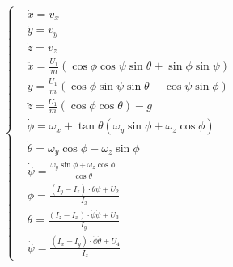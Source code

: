 \documentclass[lang=chs, degree=master, blindreview=true, winfonts=true]{yanputhesis}
\begin{document}
\begin{equation}
		\left\{
	\begin{aligned}
		&\dot{x}=v_{x}\\
		&\dot{y}=v_{y}\\
		&\dot{z}=v_{z}\\
		&\ddot{x}=\frac{U_{1}}{m}\left(\cos\phi\cos\psi\sin\theta+\sin\phi\sin\psi\right)\\
		&\ddot{y}=\frac{U_{1}}{m}\left(\cos\phi\sin\psi\sin\theta-\cos\psi\sin\phi\right)\\
		&\ddot{z}=\frac{U_{1}}{m}\left(\cos\phi\cos\theta\right)-g\\
		&\dot{\phi}={\omega}_x+\tan\theta\left({\omega}_y\sin\phi+{\omega}_z\cos\phi\right)\\
		&\dot{\theta}={\omega}_y\cos\phi-{\omega}_z\sin\phi\\
		&\dot{\psi}=\frac{{\omega}_y\sin\phi+{\omega}_z\cos\phi}{\cos\theta}\\
		&\ddot{\phi}=\frac{(I_{y}-I_{z})\cdot \dot{\theta}\dot{\psi}+U_{2}}{I_{x}}\\
		&\ddot{\theta}=\frac{(I_{z}-I_{x})\cdot \dot{\phi}\dot{\psi}+U_{3}}{I_{y}}\\
		&\ddot{\psi}=\frac{(I_{x}-I_{y})\cdot \dot{\phi}\dot{\theta}+U_{4}}{I_{z}}\end{aligned}
	\right.
	\label{2-7}
\end{equation}
\end{document}
